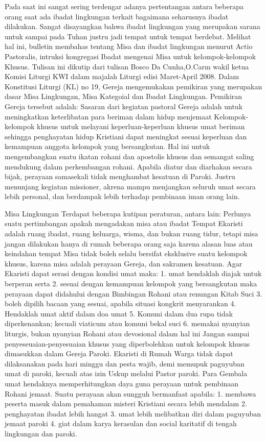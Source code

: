 Pada saat ini sangat sering terdengar adanya pertentangan antara beberapa orang saat ada ibadat lingkungan terkait bagaimana seharusnya ibadat dilakukan. Sangat disayangkan bahwa ibadat lingkungan yang merupakan sarana untuk sampai pada Tuhan justru jadi tempat untuk tempat berdebat. Melihat hal ini, bulletin membahas tentang Misa dan ibadat lingkungan menurut Actio Pastoralis, intruksi kongregasi Ibadat mengenai Misa untuk kelompok-kelompok Khusus. Tulisan ini dikutip dari tulisan Bosco Da Cunha,O.Carm wakil ketua Komisi Liturgi KWI dalam majalah Liturgi edisi Maret-April 2008.
Dalam Konstitusi Liturgi (KL) no 19, Gereja mengemukakan pemikiran yang merupakan dasar Misa Lingkungan, Misa Kategoial dan Ibadat Lingkungan. Pemikiran Gereja tersebut adalah:
Sasaran dari kegiatan pastoral Gereja adalah untuk meningkatkan keterlibatan para beriman dalam hidup menjemaat
Kelompok-kelompok khusus untuk melayani keperluan-keperluan khusus umat beriman sehingga penghayatan hidup Kristiani dapat meningkat sesuai keperluan dan kemampuan anggota kelompok yang bersangkutan. Hal ini untuk mengembangkan suatu ikatan rohani dan apostolis khusus dan semangat saling mendukung dalam perkembangan rohani.
Apabila diatur dan diarhakan secara bijak, perayaan samasekali tidak menghambat kesatuan di Paroki. Justru menunjang kegiatan missioner, akrena mampu menjangkau seluruh umat secara lebih personal, dan berdampak lebih terhadap pembinaan iman orang lain.

Misa Lingkungan
Terdapat beberapa kutipan peraturan, antara lain:
Perlunya suatu pertimbangan apakah mengadakan misa atau ibadat
Tempat Ekaristi adalah ruang ibadat, ruang keluarga, wisma, dan bukan ruang tidur, tetapi misa jangan dilakukan hanya di rumah beberapa orang saja karena alasan luas atau keindahan tempat
Misa tidak boleh selalu bersifat eksklusive suatu kelompok khusus, karena misa adalah perayaan Gereja, dan sakramen kesatuan.
Agar Ekaristi dapat serasi dengan kondisi umat maka:
1. umat hendaklah diajak untuk berperan serta
2. sesuai dengan kemampuan kelompok yang bersangkutan maka perayaan dapat didahului dengan Bimbingan Rohani atau renungan Kitab Suci
3. boleh dipilih bacaan yang sesuai, apabila situasi kongkrit menyarankan
4. Hendaklah umat aktif dalam doa umat
5. Komuni dalam dua rupa tidak diperkenankan; kecuali viaticum atau komuni bekal suci
6. memakai nyanyian liturgis, bukan nyanyian Rohani atau devosional dalam hal ini
Jangan sampai penyeseuaian-penyesuaian khusus yang diperbolehkan untuk kelompok khusus dimasukkan dalam Gereja Paroki.
Ekaristi di Rumah Warga tidak dapat dilaksanakan pada hari minggu dan pesta wajib, demi memupuk paguyuban umat di paroki, kecuali atas izin Uskup melalui Pastor paroki.
Para Gembala umat hendaknya memperhitungkan daya guna perayaan untuk pembinaan Rohani jemaat. Suatu perayaan akan sungguh bermanfaat apabila:
1. membawa peserta masuk dalam pemahaman misteri Kristiani secara lebih mendalam
2. penghayatan ibadat lebih hangat
3. umat lebih melibatkan diri dalam paguyuban jemaat paroki
4. giat dalam karya kerasulan dan social karitatif di tengah lingkungan dan paroki.

